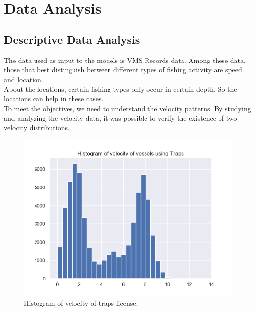 % 
% 
%
\chapter{Data Analysis}
\label{cha:data}


\section{Descriptive Data Analysis} %
\label{sub:data_analysis}



The data used as input to the models is VMS Records data. Among these data, those that best distinguish between different types of fishing activity are speed and location.\\
About the locations, certain fishing types only occur in certain depth. So the locations can help in these cases. \\
To meet the objectives, we need to understand the velocity patterns.
By studying and analyzing the velocity data, it was possible to verify the existence of two velocity distributions.

\begin{figure}[h]
\centering
\includegraphics[width=0.8\linewidth]{Chapters/img/h_armadilhas.png}
\caption{Histogram of velocity of traps license.}
\label{fig:h_armadilhas}
\end{figure}


